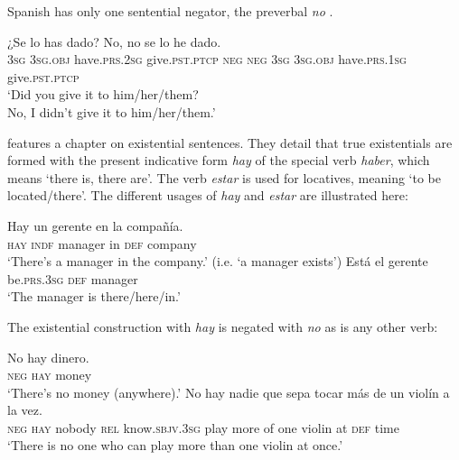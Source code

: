 \documentclass[output=paper,colorlinks,citecolor=brown]{langscibook}
\begin{document}
\begin{paperappendix}
\begin{unindented}

Spanish has only one sentential negator, the preverbal \textit{no}
\parencite[319ff]{ButtBenjamin1994}. 
%
\begin{exe}\ex \gll
¿Se lo has dado?\hspace{2.5in}
No, no se lo he dado.
\\
\textsc{3sg} \textsc{3sg.obj} have.\textsc{prs.2sg} give.\textsc{pst.ptcp}
\textsc{neg} \textsc{neg} \textsc{3sg} \textsc{3sg.obj} have.\textsc{prs.1sg} give.\textsc{pst.ptcp}
        \\
    \glt
‘Did you give it to him/her/them?\\
No, I didn’t give it to him/her/them.' \parencite[320]{ButtBenjamin1994}
    \end{exe}

\textcite[382ff]{ButtBenjamin1994} features a chapter on existential
sentences. They detail that true existentials are formed with the present
indicative form \textit{hay} of the special verb \textit{haber}, which
means `there is, there are'. The verb \textit{estar} is used for locatives,
meaning `to be located\slash there'. The different usages of \textit{hay} and \textit{estar} are illustrated here:
%
\begin{exe}\ex \gll Hay un gerente en la compañía. \\
\textsc{hay} \textsc{indf} manager in \textsc{def} company \\
    \glt `There's a manager in the company.' (i.e. `a manager exists')
\parencite[383]{ButtBenjamin1994}
\ex \gll Está el gerente \\
be.\textsc{prs.3sg} \textsc{def} manager \\
    \glt `The manager is there/here/in.' \parencite[383]{ButtBenjamin1994}
    \end{exe}

The existential construction with \textit{hay} is negated with \textit{no} as is any other verb:
%
\begin{exe}\ex \gll No hay dinero. \\
\textsc{neg} \textsc{hay} money \\
    \glt `There's no money (anywhere).' \parencite[383]{ButtBenjamin1994}
\ex \gll No hay nadie que  sepa tocar más  de un violín a  la vez. \\
\textsc{neg} \textsc{hay} nobody \textsc{rel} know.\textsc{sbjv.3sg} play  more of  one violin at \textsc{def} time \\
    \glt `There is no one who can play more than one violin at once.'
\parencite[269]{ButtBenjamin1994}
    \end{exe}


\end{unindented}
\end{paperappendix}
\end{document}
